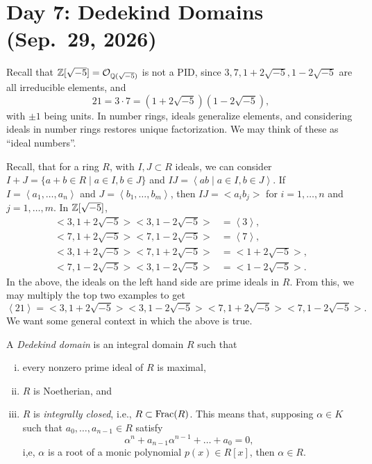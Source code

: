 \section{Day 7: Dedekind Domains (Sep.\ 29, 2026)}
Recall that $\mathbb Z[\sqrt{-5}] = \mathcal O_{\mathbb Q(\sqrt{-5})}$ is not a PID, since $3, 7, 1 + 2\sqrt{-5}, 1 - 2\sqrt{-5}$ are all irreducible elements, and
\[ 21 = 3 \cdot 7 = (1 + 2 \sqrt{-5})(1 - 2 \sqrt{-5}), \]
with $\pm 1$ being units. In number rings, ideals generalize elements, and considering ideals in number rings restores unique factorization. {\color{airforceblue}We may think of these as ``ideal numbers''.}

Recall, that for a ring $R$, with $I, J \subset R$ ideals, we can consider $I + J = \{a + b \in R \mid a \in I, b \in J\}$ and $IJ = \left<ab \mid a \in I, b \in J\right>$. If $I = \left<a_1, \dots, a_n\right>$ and $J = \left<b_1, \dots, b_m\right>$, then $IJ = \bigl<a_ib_j\bigr>$ for $i = 1, \dots, n$ and $j = 1, \dots, m$. In $\mathbb Z[\sqrt{-5}]$,
\begin{align*}
    \bigl<3, 1 + 2 \sqrt{-5}\bigr> \bigl<3, 1 - 2 \sqrt{-5}\bigr> &= \left<3\right>, \\
    \bigl<7, 1 + 2 \sqrt{-5}\bigr> \bigl<7, 1 - 2 \sqrt{-5}\bigr> &= \left<7\right>, \\
    \bigl<3, 1 + 2 \sqrt{-5}\bigr> \bigl<7, 1 + 2 \sqrt{-5}\bigr> &= \bigl<1+2\sqrt{-5}\bigr>, \\
    \bigl<7, 1 - 2 \sqrt{-5}\bigr> \bigl<3, 1 - 2 \sqrt{-5}\bigr> &= \bigl<1-2\sqrt{-5}\bigr>.
\end{align*}
In the above, the ideals on the left hand side are prime ideals in $R$. From this, we may multiply the top two examples to get
\[ \left<21\right> = \bigl<3, 1 + 2 \sqrt{-5}\bigr> \bigl<3, 1 - 2 \sqrt{-5}\bigr> \bigl<7, 1 + 2 \sqrt{-5}\bigr> \bigl<7, 1 - 2 \sqrt{-5}\bigr>. \]
We want some general context in which the above is true.

\begin{definition} \label{defn:dedekind_domain}
    A \textit{Dedekind domain} is an integral domain $R$ such that
    \begin{enumerate}[(i)]
        \item every nonzero prime ideal of $R$ is maximal, 
        \item $R$ is Noetherian, and
        \item $R$ is \textit{integrally closed}, i.e., $R \subset \operatorname{Frac}(R)$. This means that, supposing $\alpha \in K$ such that $a_0, \dots, a_{n-1} \in R$ satisfy
        \[ \alpha^n + a_{n-1} \alpha^{n-1} + \dots + a_0 = 0, \]
        i,e, $\alpha$ is a root of a monic polynomial $p(x) \in R[x]$, then $\alpha \in R$.
    \end{enumerate}
\end{definition}

